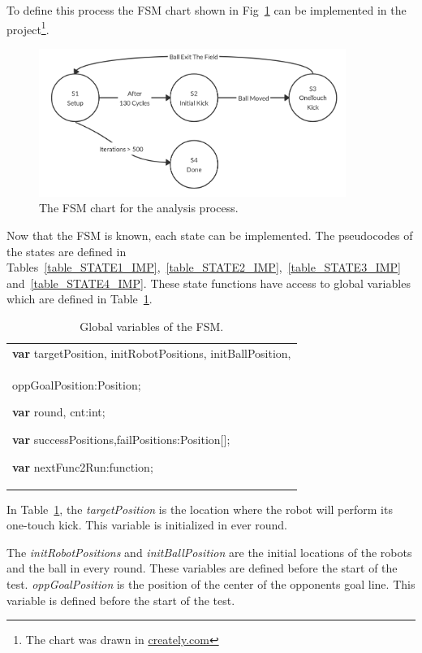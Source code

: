 \documentclass[runningheads]{llncs}
\begin{document}
To define this process the FSM chart shown in Fig~\ref{fig_ANALYZE_FSM} can be implemented in the project\footnote{The chart was drawn in \url{creately.com}}.

\begin{figure}
\centering
\includegraphics[width=10cm]{images/Analyze_FSM.png}\caption{The FSM chart for the analysis process.} \label{fig_ANALYZE_FSM}
\end{figure}

Now that the FSM is known, each state can be implemented. The pseudocodes of the states are defined in Tables~\ref{table_STATE1_IMP},~\ref{table_STATE2_IMP},~\ref{table_STATE3_IMP} and~\ref{table_STATE4_IMP}. These state functions have access to global variables which are defined in Table~\ref{table_GLOBAL_VARS}.

\begin{table}
\caption{Global variables of the FSM.}
\center
\label{table_GLOBAL_VARS}
\begin{tabular}{|p{10cm}|}
\hline
\textbf{var} 
targetPosition,
initRobotPositions,
initBallPosition,\\
\quad oppGoalPosition:Position;

\textbf{var}
round, cnt:int;

\textbf{var}
successPositions,failPositions:Position[];

\textbf{var}
nextFunc2Run:function;\\

\hline
\end{tabular}
\end{table}

In Table~\ref{table_GLOBAL_VARS}, the \textit{targetPosition} is the location where the robot will perform its one-touch kick. This variable is initialized in ever round. 

The \textit{initRobotPositions} and \textit{initBallPosition} are the initial locations of the robots and the ball in every round. These variables are defined before the start of the test. \textit{oppGoalPosition} is the position of the center of the opponents goal line. This variable is defined before the start of the test.
\end{document}
